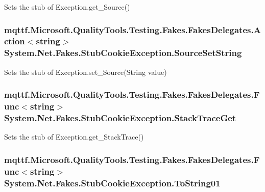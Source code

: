 Sets the stub of Exception.\-get\-\_\-\-Source()

\hypertarget{class_system_1_1_net_1_1_fakes_1_1_stub_cookie_exception_a64297313750b513d9028033835b09499}{
\subsubsection[{Source\-Set\-String}]{\setlength{\rightskip}{0pt plus 5cm}mqttf.\-Microsoft.\-Quality\-Tools.\-Testing.\-Fakes.\-Fakes\-Delegates.\-Action$<$string$>$ System.\-Net.\-Fakes.\-Stub\-Cookie\-Exception.\-Source\-Set\-String}}\label{class_system_1_1_net_1_1_fakes_1_1_stub_cookie_exception_a64297313750b513d9028033835b09499}


Sets the stub of Exception.\-set\-\_\-\-Source(\-String value)

\hypertarget{class_system_1_1_net_1_1_fakes_1_1_stub_cookie_exception_ab400c17c520a523102c41c929ac7af8f}{
\subsubsection[{Stack\-Trace\-Get}]{\setlength{\rightskip}{0pt plus 5cm}mqttf.\-Microsoft.\-Quality\-Tools.\-Testing.\-Fakes.\-Fakes\-Delegates.\-Func$<$string$>$ System.\-Net.\-Fakes.\-Stub\-Cookie\-Exception.\-Stack\-Trace\-Get}}\label{class_system_1_1_net_1_1_fakes_1_1_stub_cookie_exception_ab400c17c520a523102c41c929ac7af8f}


Sets the stub of Exception.\-get\-\_\-\-Stack\-Trace()

\hypertarget{class_system_1_1_net_1_1_fakes_1_1_stub_cookie_exception_a37d8a6d761f7b7a31bce3c6cdc89426d}{
\subsubsection[{To\-String01}]{\setlength{\rightskip}{0pt plus 5cm}mqttf.\-Microsoft.\-Quality\-Tools.\-Testing.\-Fakes.\-Fakes\-Delegates.\-Func$<$string$>$ System.\-Net.\-Fakes.\-Stub\-Cookie\-Exception.\-To\-String01}}\label{class_system_1_1_net_1_1_fakes_1_1_stub_cookie_exception_a37d8a6d761f7b7a31bce3c6cdc89426d}


